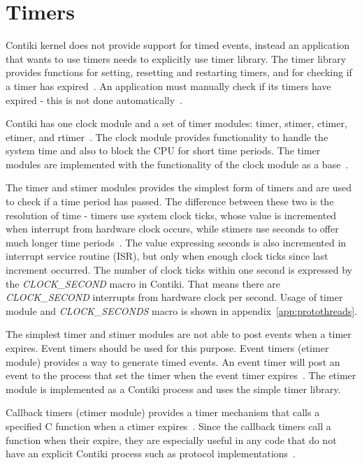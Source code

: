 
\section{Timers}\label{sec:contiki-timers}
Contiki kernel does not provide support for timed events,
instead an application that wants to use timers needs to explicitly use timer library.
The timer library provides functions for setting, resetting and restarting timers,
and for checking if a timer has expired~\cite{contiki-docs}.
An application must manually check if its timers have expired - this is not done automatically~\cite{contiki-docs}.

Contiki has one clock module and a set of timer modules: timer, stimer, ctimer, etimer, and rtimer~\cite{contiki-wiki-timers}.
The clock module provides functionality to handle the system time and also to block the CPU for short time periods.
The timer modules are implemented with the functionality of the clock module as a base~\cite{contiki-wiki-timers}.

The timer and stimer modules provides the simplest form of timers and are used to check if a time period has passed.
The difference between these two is the resolution of time -
timers use system clock ticks, whose value is incremented when interrupt from hardware clock occurs,
while stimers use seconds to offer much longer time periods~\cite{contiki-wiki-timers}.
The value expressing seconds is also incremented in interrupt service routine (ISR),
but only when enough clock ticks since last increment occurred.
The number of clock ticks within one second is expressed by the {\it{CLOCK\_SECOND}} macro in Contiki.
That means there are {\it{CLOCK\_SECOND}} interrupts from hardware clock per second.
Usage of timer module and {\it{CLOCK_SECONDS}} macro is shown in appendix~\ref{app:protothreads}.

The simplest timer and stimer modules are not able to post events when a timer expires.
Event timers should be used for this purpose.
Event timers (etimer module) provides a way to generate timed events.
An event timer will post an event to the process that set the timer when the
event timer expires~\cite{contiki-docs}.
The etimer module is implemented as a Contiki process and uses the simple timer library.

Callback timers (ctimer module) provides a timer mechanism that calls a specified
C function when a ctimer expires~\cite{contiki-docs}.
Since the callback timers call a function when their expire,
they are especially useful in any code that do not have an
explicit Contiki process such as protocol implementations~\cite{contiki-wiki-timers}.

